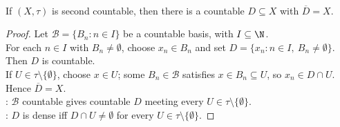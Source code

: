 \begin{proposition} \label{prop:second-countable-implies-separable} \\
If $(X,\tau)$ is second countable, then there is a countable $D\subseteq X$ with $\overline{D}=X$.
\begin{proof}
Let $\mathcal{B}=\{B_n:n\in I\}$ be a countable basis, with $I\subseteq\N$.\\
For each $n\in I$ with $B_n\neq\emptyset$, choose $x_n\in B_n$ and set $D=\{x_n:n\in I,\ B_n\neq\emptyset\}$. Then $D$ is countable.\\
If $U\in\tau\setminus\{\emptyset\}$, choose $x\in U$; some $B_n\in\mathcal{B}$ satisfies $x\in B_n\subseteq U$, so $x_n\in D\cap U$. Hence $\overline{D}=X$.\\
: $\mathcal{B}$ countable gives countable $D$ meeting every $U\in\tau\setminus\{\emptyset\}$.\\
: $D$ is dense iff $D\cap U\neq\emptyset$ for every $U\in\tau\setminus\{\emptyset\}$.
\end{proof}
\end{proposition}
